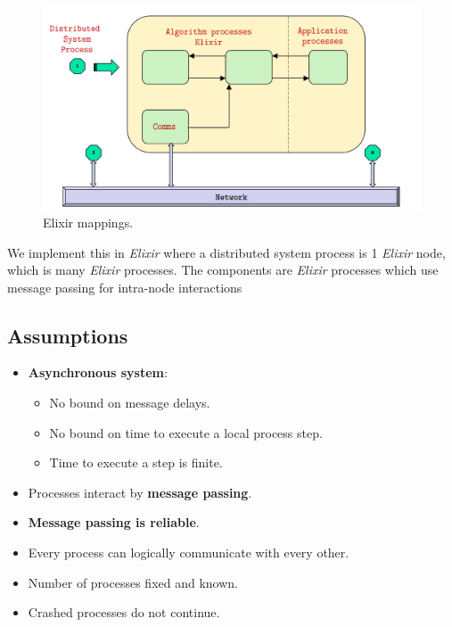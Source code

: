 \documentclass[11pt]{article}
\begin{document}
\begin{figure}[htb!]
  \centering
  \caption{Elixir mappings.}
  \includegraphics[scale=0.3]{elixirmapping}
\end{figure}

We implement this in \textit{Elixir} where a distributed system process is 1 \textit{Elixir} node, which is many \textit{Elixir} processes.
The components are \textit{Elixir} processes which use message passing for intra-node interactions

\subsection{Assumptions}
\begin{itemize}
  \item \textbf{Asynchronous system}:
    \begin{itemize}
      \item No bound on message delays.
      \item No bound on time to execute a local process step.
      \item Time to execute a step is finite.
    \end{itemize}
  \item Processes interact by \textbf{message passing}.
  \item \textbf{Message passing is reliable}.
  \item Every process can logically communicate with every other.
  \item Number of processes fixed and known.
  \item Crashed processes do not continue.
\end{itemize}
\end{document}
